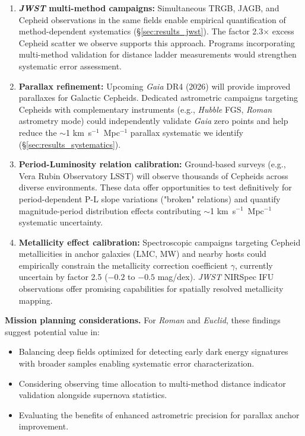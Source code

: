 \documentclass[twocolumn, linenumbers]{aastex701}
\begin{document}
\begin{enumerate}
\item \textbf{\textit{JWST} multi-method campaigns:} Simultaneous TRGB, JAGB, and Cepheid observations in the same fields enable empirical quantification of method-dependent systematics (\S\ref{sec:results_jwst}). The factor 2.3$\times$ excess Cepheid scatter we observe supports this approach. Programs incorporating multi-method validation for distance ladder measurements would strengthen systematic error assessment.

\item \textbf{Parallax refinement:} Upcoming \textit{Gaia} DR4 (2026) will provide improved parallaxes for Galactic Cepheids. Dedicated astrometric campaigns targeting Cepheids with complementary instruments (e.g., \textit{Hubble} FGS, \textit{Roman} astrometry mode) could independently validate \textit{Gaia} zero points and help reduce the $\sim$1 km~s$^{-1}$~Mpc$^{-1}$ parallax systematic we identify (\S\ref{sec:results_systematics}).

\item \textbf{Period-Luminosity relation calibration:} Ground-based surveys (e.g., Vera Rubin Observatory LSST) will observe thousands of Cepheids across diverse environments. These data offer opportunities to test definitively for period-dependent P-L slope variations ("broken" relations) and quantify magnitude-period distribution effects contributing $\sim$1 km~s$^{-1}$~Mpc$^{-1}$ systematic uncertainty.

\item \textbf{Metallicity effect calibration:} Spectroscopic campaigns targeting Cepheid metallicities in anchor galaxies (LMC, MW) and nearby hosts could empirically constrain the metallicity correction coefficient $\gamma$, currently uncertain by factor 2.5 ($-0.2$ to $-0.5$ mag/dex). \textit{JWST} NIRSpec IFU observations offer promising capabilities for spatially resolved metallicity mapping.
\end{enumerate}

\textbf{Mission planning considerations.} For \textit{Roman} and \textit{Euclid}, these findings suggest potential value in:
\begin{itemize}
\item Balancing deep fields optimized for detecting early dark energy signatures with broader samples enabling systematic error characterization.
\item Considering observing time allocation to multi-method distance indicator validation alongside supernova statistics.
\item Evaluating the benefits of enhanced astrometric precision for parallax anchor improvement.
\end{itemize}
\end{document}
